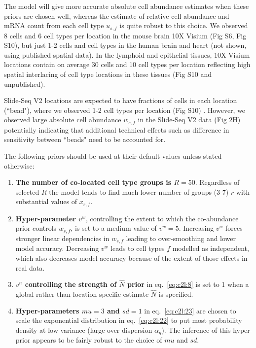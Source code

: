 \documentclass[11pt,a4paper]{article}
\begin{document}
The model will give more accurate absolute cell abundance estimates when these priors are chosen well, whereas the estimate of relative cell abundance and mRNA count from each cell type $u_{s,f}$ is quite robust to this choice. We observed 8 cells and 6 cell types per location in the mouse brain 10X Visium (Fig S6, Fig S10), but just 1-2 cells and cell types in the human brain and heart (not shown, using published spatial data). In the lymphoid and epithelial tissues, 10X Visium locations contain on average 30 cells and 10 cell types per location reflecting high spatial interlacing of cell type locations in these tissues (Fig S10 and unpublished). 

Slide-Seq V2 locations are expected to have fractions of cells in each location (``bead"), where we observed 1-2 cell types per location (Fig S10) \autocite{cable_robust_2020}. However, we observed large absolute cell abundance $w_{s,f}$ in the Slide-Seq V2 data (Fig 2H) potentially indicating that additional technical effects such as difference in sensitivity between ``beads" need to be accounted for. \newline


The following priors should be used at their default values unless stated otherwise:
\begin{enumerate}
    \item \textbf{The number of co-located cell type groups is $R=50$}. Regardless of selected $R$ the model tends to find much lower number of groups (3-7) $r$ with substantial values of $x_{r,f}$.
    \item \textbf{Hyper-parameter $v^w$}, controlling the extent to which the co-abundance prior controls $w_{s,f}$, is set to a medium value of $v^w=5$. Increasing $v^w$ forces stronger linear dependencies in $w_{s,f}$ leading to over-smoothing and lower model accuracy. Decreasing $v^w$ leads to cell types $f$ modelled as independent, which also decreases model accuracy because of the extent of those effects in real data.
    \item \textbf{$v^n$ controlling the strength of $\hat{N}$ prior} in eq.~\eqref{eq:c2l:8} is set to 1 when a global rather than location-specific estimate $\hat{N}$ is specified.
    \item  \textbf{Hyper-parameters $mu=3$ and $sd=1$} in eq.~\eqref{eq:c2l:23} are chosen to scale the exponential distribution in eq.~\eqref{eq:c2l:22} to put most probability density at low variance (large over-dispersion $\alpha_g$). The inference of this hyper-prior appears to be fairly robust to the choice of $mu$ and $sd$.
\end{enumerate}
\end{document}
